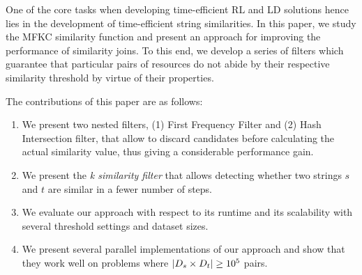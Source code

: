 One of the core tasks when developing time-efficient RL and LD solutions hence lies in the development of time-efficient string similarities. 
In this paper, we study the MFKC similarity function \cite{seker2014novel} and present an approach for improving the performance of similarity joins.
To this end, we develop a series of filters which guarantee that particular pairs of resources do not abide by their respective similarity threshold by virtue of their properties.


The contributions of this paper are as follows:

\begin{enumerate}
	
	\item We present two nested filters, (1) First Frequency Filter and (2) Hash Intersection filter, that allow to discard candidates before calculating the actual similarity value, thus giving a considerable performance gain.
	
	\item We present the \emph{k similarity filter} that allows detecting whether two strings $s$ and $t$ are similar in a fewer number of steps. 
	
	
	\item We evaluate our approach with respect to its runtime and
	its scalability with several threshold settings and
	dataset sizes.%
	
	\item We present several parallel implementations of our approach and show that they work well on problems where $|{D_s}{} \times {\ensuremath{D_t}}{}| \geq 10^5$ pairs. 
\end{enumerate}


